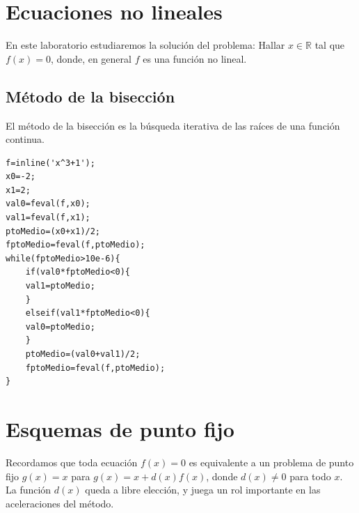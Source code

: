 \documentclass[11pt]{article}
\begin{document}

\section{Ecuaciones no lineales}

En este laboratorio estudiaremos la soluci\'on del problema: Hallar $x\in\mathbb{R}$ tal que $f(x)=0$, donde, en general $f$ es una funci\'on no lineal.

\subsection{M\'etodo de la bisecci\'on}
El m\'etodo de la bisecci\'on es la b\'usqueda iterativa de las ra\'ices de una funci\'on continua.
\begin{lstlisting}
f=inline('x^3+1');
x0=-2;
x1=2;
val0=feval(f,x0);
val1=feval(f,x1);
ptoMedio=(x0+x1)/2;
fptoMedio=feval(f,ptoMedio);
while(fptoMedio>10e-6){
	if(val0*fptoMedio<0){
    val1=ptoMedio;
    }
    elseif(val1*fptoMedio<0){
    val0=ptoMedio;
    }
    ptoMedio=(val0+val1)/2;
    fptoMedio=feval(f,ptoMedio);    
}
\end{lstlisting}

\section{Esquemas de punto fijo}

Recordamos que toda ecuaci\'on $f(x)=0$ es equivalente a un problema de punto fijo $g(x)=x$ para $g(x)=x+d(x)f(x)$, donde $d(x)\neq 0$ para todo $x$. La funci\'on $d(x)$  queda a libre elecci\'on, y juega un rol importante en las aceleraciones del m\'etodo.
\end{document}
